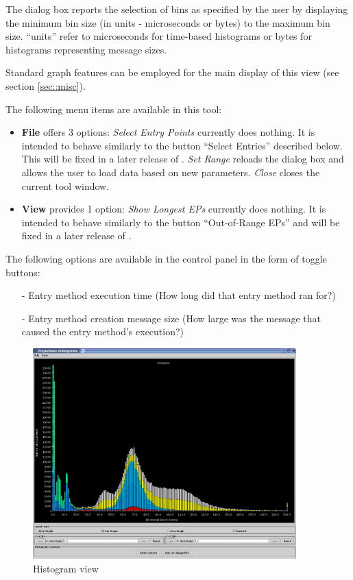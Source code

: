 \documentclass[10pt]{report}
\begin{document}
The dialog box reports the selection of bins as specified by the user
by displaying the minimum bin size (in units - microseconds or bytes)
to the maximum bin size. ``units'' refer to microseconds for time-based
histograms or bytes for histograms representing message sizes.

Standard graph features can be employed for the main display of this
view (see section \ref{sec::misc}). 

The following menu items are available in this tool:

\begin{itemize}
\item {\bf File} offers 3 options: {\it Select Entry Points} currently
does nothing. It is intended to behave similarly to the button ``Select
Entries'' described below. This will be fixed in a later release of
\projections{}. {\it Set Range} reloads the dialog box and allows the
user to load data based on new parameters. {\it Close} closes the current
tool window.
\item {\bf View} provides 1 option: {\it Show Longest EPs} currently
does nothing. It is intended to behave similarly to the button 
``Out-of-Range EPs'' and will be fixed in a later release of \projections{}.
\end{itemize}

The following options are available in the control panel in the form
of toggle buttons:

\begin{itemize}
\item[-] Entry method execution time (How long did that entry method ran 
for?)
\item[-] Entry method creation message size (How large was the message
that caused the entry method's execution?)
\end{itemize}

\begin{figure}[htb]
\center
\includegraphics[width=4.0in]{fig/histogram}
\caption{Histogram view}
\label{histogram}
\end{figure}
\end{document}
